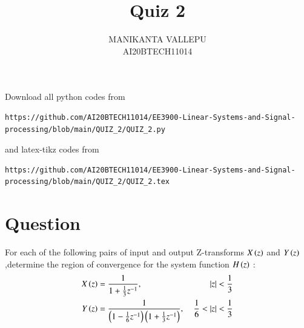 \documentclass[journal,12pt,twocolumn]{IEEEtran}
\begin{document}
\makeatletter
{}
\makeatother
\let\StandardTheFigure\thefigure
\let\vec\mathbf
\renewcommand{\thefigure}{\theproblem}
\def\putbox#1#2#3{\makebox[0in][l]{\makebox[#1][l]{}\raisebox{\baselineskip}[0in][0in]{\raisebox{#2}[0in][0in]{#3}}}}
     \def\rightbox#1{\makebox[0in][r]{#1}}
     \def\centbox#1{\makebox[0in]{#1}}
     \def\topbox#1{\raisebox{-\baselineskip}[0in][0in]{#1}}
     \def\midbox#1{\raisebox{-0.5\baselineskip}[0in][0in]{#1}}
\vspace{3cm}
\title{Quiz 2}
\author{MANIKANTA VALLEPU \\ AI20BTECH11014}
\maketitle
\newpage
\bigskip
\renewcommand{\thefigure}{\theenumi}
\renewcommand{\thetable}{\theenumi}
Download all python codes from 
\begin{lstlisting}
https://github.com/AI20BTECH11014/EE3900-Linear-Systems-and-Signal-processing/blob/main/QUIZ_2/QUIZ_2.py
\end{lstlisting}
%
and latex-tikz codes from 
%
\begin{lstlisting}
https://github.com/AI20BTECH11014/EE3900-Linear-Systems-and-Signal-processing/blob/main/QUIZ_2/QUIZ_2.tex
\end{lstlisting}
%
\section{Question}
For each of the following pairs of input and output Z-transforms $X\left(z\right)$ and $Y\left(z\right)$,determine the region of convergence for the system function $H\left(z\right)$ : 
\begin{align}
    X\left(z\right) &= \dfrac{1}{1+ \frac{1}{3}z^{-1}} ,\ &\vert z\vert < \frac{1}{3} \label{a}\\
    Y\left(z\right) &= \dfrac{1}{\left(1- \frac{1}{6}z^{-1}\right)\left(1+ \frac{1}{3}z^{-1}\right)}, \ &\frac{1}{6} < \vert z\vert < \frac{1}{3} \label{b}
\end{align}
\end{document}

